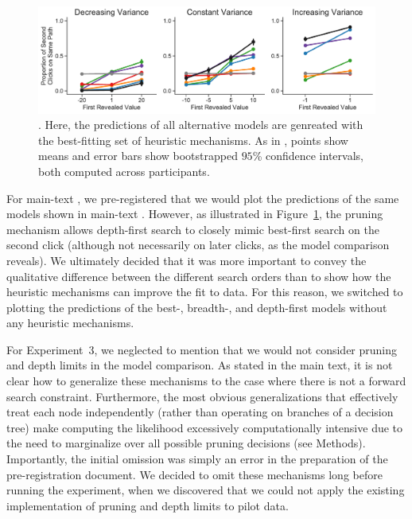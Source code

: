 \begin{figure}[t!]
    \centering
    \includegraphics[width=\textwidth]{figs/planning/second_click_alt.pdf}
    \caption{. Here, the predictions of all alternative models are genreated with the best-fitting set of heuristic mechanisms. As in , points show means and error bars show bootstrapped $95$\% confidence intervals, both computed across participants.
    }
    \label{fig:second_click_alt}
\end{figure}

For main-text , we pre-registered that we would plot the predictions of the same models shown in main-text . However, as illustrated in Figure~\ref{fig:second_click_alt}, the pruning mechanism allows depth-first search to closely mimic best-first search on the second click (although not necessarily on later clicks, as the model comparison reveals). We ultimately decided that it was more important to convey the qualitative difference between the different search orders than to show how the heuristic mechanisms can improve the fit to data. For this reason, we switched to plotting the predictions of the best-, breadth-, and depth-first models without any heuristic mechanisms.

For Experiment~3, we neglected to mention that we would not consider pruning and depth limits in the model comparison. As stated in the main text, it is not clear how to generalize these mechanisms to the case where there is not a forward search constraint. Furthermore, the most obvious generalizations that effectively treat each node independently (rather than operating on branches of a decision tree) make computing the likelihood excessively computationally intensive due to the need to marginalize over all possible pruning decisions (see Methods). Importantly, the initial omission was simply an error in the preparation of the pre-registration document. We decided to omit these mechanisms long before running the experiment, when we discovered that we could not apply the existing implementation of pruning and depth limits to pilot data.

